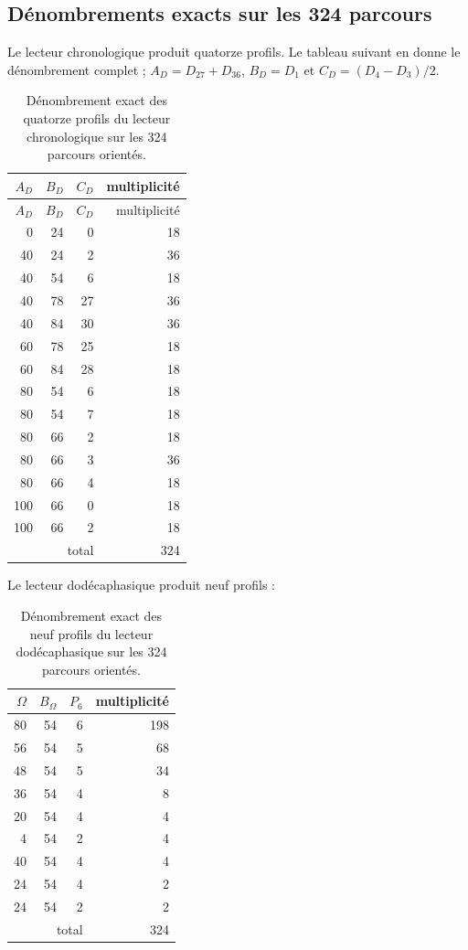 \subsection{Dénombrements exacts sur les 324 parcours}

Le lecteur chronologique produit quatorze profils. Le tableau suivant en donne le
dénombrement complet ; \(A_D=D_{27}+D_{36}\), \(B_D=D_1\) et
\(C_D=(D_4-D_3)/2\).

\begin{longtable}{@{}rrr r@{}}
\caption{Dénombrement exact des quatorze profils du lecteur chronologique sur les
324 parcours orientés.}
\label{tab:censo-perfiles-kd-rev11}\\
\toprule
\(A_D\)&\(B_D\)&\(C_D\)&multiplicité\\
\midrule
\endfirsthead
\toprule
\(A_D\)&\(B_D\)&\(C_D\)&multiplicité\\
\midrule
\endhead
0&24&0&18\\
40&24&2&36\\
40&54&6&18\\
40&78&27&36\\
40&84&30&36\\
60&78&25&18\\
60&84&28&18\\
80&54&6&18\\
80&54&7&18\\
80&66&2&18\\
80&66&3&36\\
80&66&4&18\\
100&66&0&18\\
100&66&2&18\\
\midrule
\multicolumn{3}{r}{total}&324\\
\bottomrule
\end{longtable}

Le lecteur dodécaphasique produit neuf profils :

\begin{table}[H]
\centering
\caption{Dénombrement exact des neuf profils du lecteur dodécaphasique sur
les 324 parcours orientés.}
\label{tab:censo-perfiles-komega-rev11}
\begin{tabular}{@{}rrr r@{}}
\toprule
\(\Omega\)&\(B_\Omega\)&\(P_6\)&multiplicité\\
\midrule
80&54&6&198\\
56&54&5&68\\
48&54&5&34\\
36&54&4&8\\
20&54&4&4\\
4&54&2&4\\
40&54&4&4\\
24&54&4&2\\
24&54&2&2\\
\midrule
\multicolumn{3}{r}{total}&324\\
\bottomrule
\end{tabular}
\end{table}


